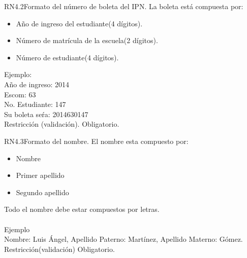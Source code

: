 \begin{BussinesRule}{RN4.2}{Formato del número de boleta del IPN.}
	\BRitem[Descripción:] La boleta está compuesta por:
		\begin{itemize} 
			\item Año de ingreso del estudiante(4 dígitos).
			\item Número de matrícula de la escuela(2 dígitos).
			\item Número de estudiante(4 dígitos).
		\end{itemize}
	Ejemplo:\\
		Año de ingreso: 2014\\
		Escom: 63\\
		No. Estudiante: 147\\
		Su boleta seŕa: 2014630147\\
	\BRitem[Tipo:] Restricción (validación).
	\BRitem[Nivel:] Obligatorio.
\end{BussinesRule}


\begin{BussinesRule}{RN4.3}{Formato del nombre.}
	\BRitem[Descripción:] El nombre esta compuesto por:
		\begin{itemize} 
			\item Nombre
			\item Primer apellido
			\item Segundo apellido 
		\end{itemize}
		Todo el nombre debe estar compuestos por letras.\\\\
Ejemplo \\
	Nombre: Luis Ángel, Apellido Paterno: Martínez, Apellido Materno: Gómez.
	\BRitem[Tipo:] Restricción(validación)
	\BRitem[Nivel:] Obligatorio.
\end{BussinesRule}


